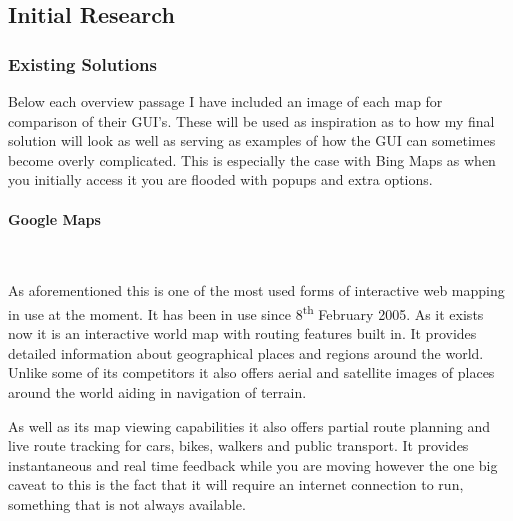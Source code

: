 \begin{flushleft}
        \subsection{Initial Research} 
            \subsubsection{Existing Solutions}
            Below each overview passage I have included an image of each map for comparison of their GUI's. These will be used as inspiration as to how my final solution will look as well 
            as serving as examples of how the GUI can sometimes become overly complicated. This is especially the case with Bing Maps as when you initially access it you are flooded with 
            popups and extra options. \\
            \paragraph{Google Maps} \mbox{} \\
            \bk
            
            As aforementioned this is one of the most used forms of interactive web mapping in use at the moment. It has been in use since 8\textsuperscript{th} February 2005. As it exists
            now it is an interactive world map with routing features built in. It provides detailed information about geographical places and regions around the world. Unlike some of its
            competitors it also offers aerial and satellite images of places around the world aiding in navigation of terrain. \\
            
            \bk
            
            As well as its map viewing capabilities it also offers partial route planning and live route tracking for cars, bikes, walkers and public transport. It provides instantaneous and
            real time feedback while you are moving however the one big caveat to this is the fact that it will require an internet connection to run, something that is not always available. \\
            \bk
            

\end{flushleft}
